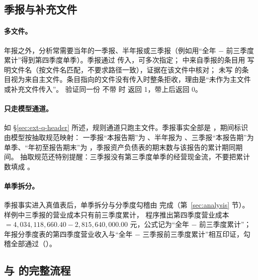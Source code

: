 \subsection{季报与补充文件}
\label{sec:ext-quarterly}

\paragraph{多文件。}
年报之外，分析常需要当年的一季报、半年报或三季报（例如用“全年 $-$ 前三季度累计”得到第四季度单季）。季报通过  传入，可多次指定；
 中来自季报的条目用  写明文件名（按文件名匹配，不要求路径一致），证据在该文件中核对；
未写  的条目视为来自主文件。条目指向的文件没有传入时整条拒收，理由是“未作为主文件或补充文件传入”。
 验证同一份  不带  时  返回 1，带上后返回 0。

\paragraph{只走模型通道。}
如 \S\ref{sec:ext-q-header} 所述，规则通道只跑主文件。季报事实全部是 ，期间标识由模型按抽取规范映射：
一季报“本报告期”为 、半年报为 、三季报“本报告期”为  单季、“年初至报告期末”为 ，季报资产负债表的期末数与该报告的累计期同期间。
抽取规范还特别提醒：三季报没有第三季度单季的经营现金流，不要把累计数填成 。

\paragraph{单季拆分。}
季报事实进入真值表后，单季拆分与分季度勾稽由  完成（第~\ref{sec:analysis} 节）。样例中三季报的营业成本只有前三季度累计，
程序推出第四季度营业成本 $= 4{,}034{,}118{,}660.40 - 2{,}815{,}640{,}000.00$ 元，公式记为“全年 − 前三季度累计”；
年报分季度表的第四季度营业收入与“全年 − 三季报前三季度累计”相互印证，勾稽全部通过（）。

\subsection{ 与  的完整流程}
\label{sec:ext-verify}

